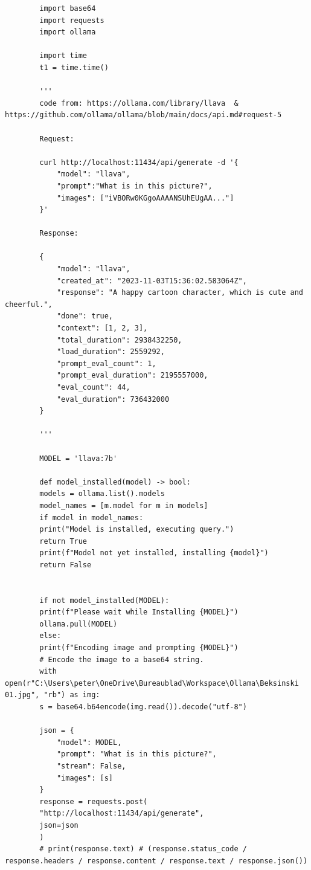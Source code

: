 \begin{listing}
    \begin{verbatim}
        import base64
        import requests
        import ollama
        
        import time
        t1 = time.time()
        
        '''
        code from: https://ollama.com/library/llava  &  https://github.com/ollama/ollama/blob/main/docs/api.md#request-5
        
        Request:
        
        curl http://localhost:11434/api/generate -d '{
            "model": "llava",
            "prompt":"What is in this picture?",
            "images": ["iVBORw0KGgoAAAANSUhEUgAA..."]
        }'
        
        Response:
        
        {
            "model": "llava",
            "created_at": "2023-11-03T15:36:02.583064Z",
            "response": "A happy cartoon character, which is cute and cheerful.",
            "done": true,
            "context": [1, 2, 3],
            "total_duration": 2938432250,
            "load_duration": 2559292,
            "prompt_eval_count": 1,
            "prompt_eval_duration": 2195557000,
            "eval_count": 44,
            "eval_duration": 736432000
        }
        
        '''
        
        MODEL = 'llava:7b'
        
        def model_installed(model) -> bool:
        models = ollama.list().models
        model_names = [m.model for m in models]
        if model in model_names:
        print("Model is installed, executing query.")
        return True
        print(f"Model not yet installed, installing {model}")
        return False
        
        
        if not model_installed(MODEL):
        print(f"Please wait while Installing {MODEL}")
        ollama.pull(MODEL)
        else:
        print(f"Encoding image and prompting {MODEL}")
        # Encode the image to a base64 string.
        with open(r"C:\Users\peter\OneDrive\Bureaublad\Workspace\Ollama\Beksinski 01.jpg", "rb") as img:
        s = base64.b64encode(img.read()).decode("utf-8")
        
        json = {
            "model": MODEL,
            "prompt": "What is in this picture?",
            "stream": False,
            "images": [s]
        }
        response = requests.post(
        "http://localhost:11434/api/generate",
        json=json
        )
        # print(response.text) # (response.status_code / response.headers / response.content / response.text / response.json())
        

\end{verbatim}
\end{listing}
